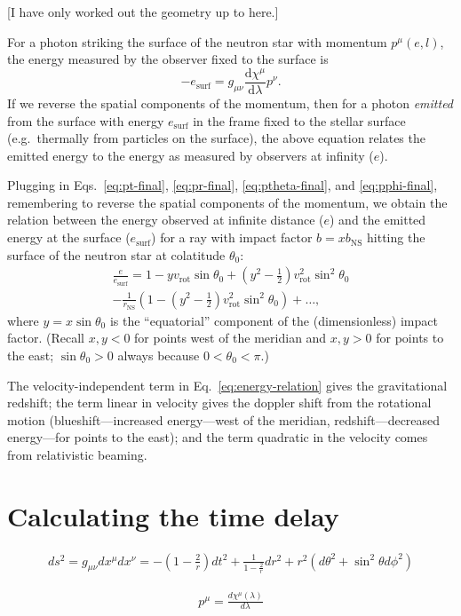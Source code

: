 \documentclass[modern]{aastex631}
\newcommand{\dd}{\mathrm{d}}
\newcommand{\bNS}{b_\mathrm{NS}}
\newcommand{\rNS}{r_\mathrm{NS}}
\newcommand{\vRot}{v_\mathrm{rot}}
\begin{document}
[I have only worked out the geometry up to here.]

For a photon striking the surface of the neutron star with momentum $p^\mu\left(
e, l \right)$, the energy measured by the observer fixed to the surface is 
\begin{equation}
    -e_\mathrm{surf} = g_{\mu\nu} \frac{\dd \chi^\mu}{\dd \lambda} p^\nu.
\end{equation}
If we reverse the spatial components of the momentum, then for a photon
\emph{emitted} from the surface with energy $e_\mathrm{surf}$ in the frame fixed
to the stellar surface (e.g.\ thermally from particles on the surface), the
above equation relates the emitted energy to the energy as measured by observers
at infinity ($e$).

Plugging in Eqs.\ \eqref{eq:pt-final}, \eqref{eq:pr-final},
\eqref{eq:ptheta-final}, and \eqref{eq:pphi-final}, remembering to reverse the
spatial components of the momentum, we obtain the relation between the energy
observed at infinite distance ($e$) and the emitted energy at the surface
($e_\mathrm{surf}$) for a ray with impact factor $b = x \bNS$ hitting the
surface of the neutron star at colatitude $\theta_0$:
\begin{multline}
    \label{eq:energy-relation}
    \frac{e}{e_\mathrm{surf}} = 1 - y \vRot \sin \theta_0 + \left( y^2 - \frac{1}{2} \right) \vRot^2 \sin^2 \theta_0 \\ 
    - \frac{1}{\rNS} \left( 1 - \left( y^2 - \frac{1}{2} \right) \vRot^2 \sin^2 \theta_0 \right) + \ldots, 
\end{multline}
where $y = x \sin \theta_0$ is the ``equatorial'' component of the
(dimensionless) impact factor.  (Recall $x, y < 0$ for points west of the
meridian and $x, y > 0$ for points to the east; $\sin \theta_0 > 0$ always
because $0 < \theta_0 < \pi$.)

The velocity-independent term in Eq.\ \eqref{eq:energy-relation} gives the
gravitational redshift; the term linear in velocity gives the doppler shift from
the rotational motion (blueshift---increased energy---west of the meridian,
redshift---decreased energy---for points to the east); and the term quadratic in
the velocity comes from relativistic beaming.

\section{Calculating the time delay}
%
\begin{linenomath}\begin{align}
    \label{eq:geodesic}
    ds^2 = g_{\mu\nu}dx^\mu dx^\nu = -(1-\frac{2}{r})dt^2 + \frac{1}{1-\frac{2}{r}}dr^2 + r^2(d\theta^2+\sin^2 \theta d\phi^2)
\end{align}\end{linenomath}
%
\begin{linenomath}\begin{align}
    \label{eq:momentum}
    p^\mu = \frac{d\chi^\mu(\lambda)}{d\lambda}
\end{align}\end{linenomath}
%
\end{document}
